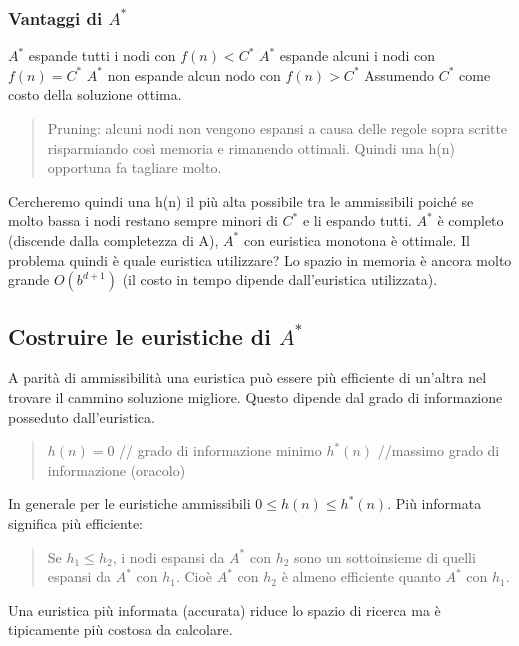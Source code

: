 \documentclass{article}
\begin{document}
\subsubsection{Vantaggi di $A^*$}
$A^*$ espande tutti i nodi con $f(n) < C^*$ \newline
$A^*$ espande alcuni i nodi con $f(n) = C^*$ \newline
$A^*$ non espande alcun nodo con $f(n) > C^*$ \newline
Assumendo $C^*$ come costo della soluzione ottima.
\begin{quote}
    Pruning: alcuni nodi non vengono espansi a causa delle regole sopra scritte risparmiando così memoria e rimanendo ottimali. Quindi una h(n) opportuna fa tagliare molto.
\end{quote}
Cercheremo quindi una h(n) il più alta possibile tra le ammissibili poiché se molto bassa i nodi restano sempre minori di $C^*$ e li espando tutti. \newline
$A^*$ è completo (discende dalla completezza di A), $A^*$ con euristica monotona è ottimale. Il problema quindi è quale euristica utilizzare? Lo spazio in memoria è ancora molto grande $O(b^{d+1})$ (il costo in tempo dipende dall'euristica utilizzata). 

\subsection{Costruire le euristiche di $A^*$}
A parità di ammissibilità una euristica può essere più efficiente di un'altra nel trovare il cammino soluzione migliore. Questo dipende dal grado di informazione posseduto dall'euristica.
\begin{quote}
    $h(n) = 0$ // grado di informazione minimo \newline
    $h^*(n)$ //massimo grado di informazione (oracolo)
\end{quote}
In generale per le euristiche ammissibili $0 \leq h(n) \leq h^*(n)$. \newline
Più informata significa più efficiente:
\begin{quote}
    Se $h_1 \leq h_2$, i nodi espansi da $A^*$ con $h_2$ sono un sottoinsieme di quelli espansi da $A^*$ con $h_1$. Cioè $A^*$ con $h_2$ è almeno efficiente quanto $A^*$ con $h_1$.
\end{quote}
Una euristica più informata (accurata) riduce lo spazio di ricerca ma è tipicamente più costosa da calcolare. 
\end{document}
